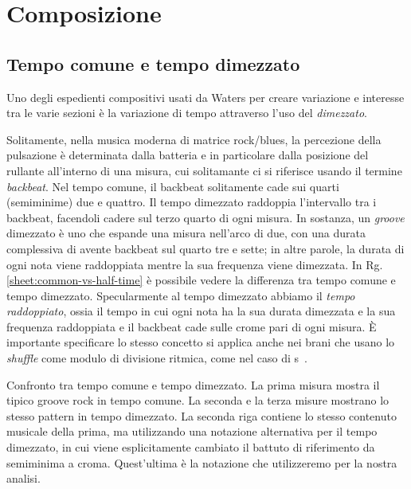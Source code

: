 \documentclass[class=book, crop=false, oneside, 12pt]{standalone}
\begin{document}
    \section{Composizione}
    \label{sec:04-arrangement}

    \subsection{Tempo comune e tempo dimezzato}
    Uno degli espedienti compositivi usati da Waters per creare variazione e interesse tra le varie sezioni è la variazione di tempo attraverso l'uso del \emph{dimezzato}. 

    Solitamente, nella musica moderna di matrice rock/blues, la percezione della pulsazione  è determinata dalla batteria e in particolare dalla posizione del rullante all'interno di una misura, cui solitamante ci si riferisce usando il termine \emph{backbeat}. Nel tempo comune, il backbeat solitamente cade  sui quarti (semiminime) due e quattro. Il tempo dimezzato raddoppia l'intervallo tra i backbeat, facendoli cadere sul terzo quarto di ogni misura. In sostanza, un \emph{groove} dimezzato è uno che espande una misura nell'arco di due, con una durata complessiva di  avente backbeat sul quarto tre e sette; in altre parole, la durata di ogni nota viene raddoppiata mentre la sua frequenza viene dimezzata. In Rg.\ref{sheet:common-vs-half-time} è possibile vedere la differenza tra tempo comune e tempo dimezzato. Specularmente al tempo dimezzato abbiamo il \emph{tempo raddoppiato}, ossia il tempo in cui ogni nota ha la sua durata dimezzata e la sua frequenza raddoppiata e il backbeat cade sulle crome pari di ogni misura. È importante specificare lo stesso concetto si applica anche nei brani che usano lo \emph{shuffle} come modulo di divisione ritmica, come nel caso di \acrshort{s}~\cite{randel2003harvard}.

    \begin{sheet}[htb]
        \centering
        \caption[Confronto tra tempo comune e tempo dimezzato.]{Confronto tra tempo comune e tempo dimezzato. La prima misura mostra il tipico groove rock in tempo comune. La seconda e la terza misure mostrano lo stesso pattern in tempo dimezzato. La seconda riga contiene lo stesso contenuto musicale della prima, ma utilizzando una notazione alternativa per il tempo dimezzato, in cui viene esplicitamente cambiato il battuto di riferimento da semiminima a croma. Quest'ultima è la notazione che utilizzeremo per la nostra analisi.}
        \label{sheet:common-vs-half-time}
    \end{sheet}
\end{document}
